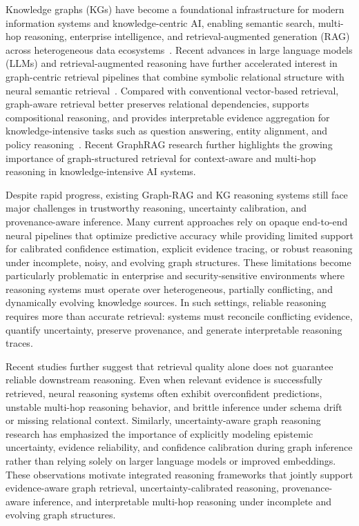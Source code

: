 \documentclass[sigconf,review,anonymous]{acmart}
\begin{document}
Knowledge graphs (KGs) have become a foundational infrastructure for modern information systems and knowledge-centric AI, enabling semantic search, multi-hop reasoning, enterprise intelligence, and retrieval-augmented generation (RAG) across heterogeneous data ecosystems~\cite{hogan2021knowledge,ji2022survey}. Recent advances in large language models (LLMs) and retrieval-augmented reasoning have further accelerated interest in graph-centric retrieval pipelines that combine symbolic relational structure with neural semantic retrieval~\cite{lewis2020retrieval}. Compared with conventional vector-based retrieval, graph-aware retrieval better preserves relational dependencies, supports compositional reasoning, and provides interpretable evidence aggregation for knowledge-intensive tasks such as question answering, entity alignment, and policy reasoning~\cite{ren2020query2box,ren2020betae}. Recent GraphRAG research further highlights the growing importance of graph-structured retrieval for context-aware and multi-hop reasoning in knowledge-intensive AI systems.

Despite rapid progress, existing Graph-RAG and KG reasoning systems still face major challenges in trustworthy reasoning, uncertainty calibration, and provenance-aware inference. Many current approaches rely on opaque end-to-end neural pipelines that optimize predictive accuracy while providing limited support for calibrated confidence estimation, explicit evidence tracing, or robust reasoning under incomplete, noisy, and evolving graph structures. These limitations become particularly problematic in enterprise and security-sensitive environments where reasoning systems must operate over heterogeneous, partially conflicting, and dynamically evolving knowledge sources. In such settings, reliable reasoning requires more than accurate retrieval: systems must reconcile conflicting evidence, quantify uncertainty, preserve provenance, and generate interpretable reasoning traces.

Recent studies further suggest that retrieval quality alone does not guarantee reliable downstream reasoning. Even when relevant evidence is successfully retrieved, neural reasoning systems often exhibit overconfident predictions, unstable multi-hop reasoning behavior, and brittle inference under schema drift or missing relational context. Similarly, uncertainty-aware graph reasoning research has emphasized the importance of explicitly modeling epistemic uncertainty, evidence reliability, and confidence calibration during graph inference rather than relying solely on larger language models or improved embeddings. These observations motivate integrated reasoning frameworks that jointly support evidence-aware graph retrieval, uncertainty-calibrated reasoning, provenance-aware inference, and interpretable multi-hop reasoning under incomplete and evolving graph structures.
\end{document}
